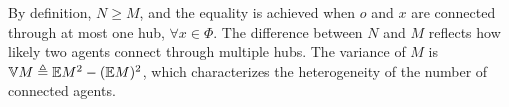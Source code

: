  
    
By definition, $N\geq M$, and the equality is achieved when $o$ and $x$ are connected through at most one hub, $\forall x\in\Phi$. The difference between $N$ and $M$ reflects how likely two agents connect through multiple hubs. The variance of $M$ is $\mathbb{V} M \triangleq \mathbb{E} M^2 - (\mathbb{E} M)^2$, which characterizes the heterogeneity of the number of connected agents.
   
   
    
       


   



